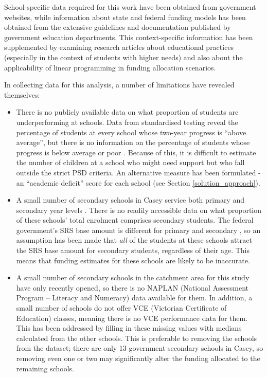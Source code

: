 \documentclass[11pt, a4paper]{article}
\begin{document}
    School-specific data required for this work have been obtained from government websites, while information about state and federal funding models has been obtained from the extensive guidelines and documentation published by government education departments. This context-specific information has been supplemented by examining research articles about educational practices (especially in the context of students with higher needs) and also about the applicability of linear programming in funding allocation scenarios.

    In collecting data for this analysis, a number of limitations have revealed themselves:

    \begin{itemize}
        \item There is no publicly available data on what proportion of students are underperforming at schools. Data from standardised testing reveal the percentage of students at every school whose two-year progress is ``above average'', but there is no information on the percentage of students whose progress is below average or poor \parencite{naplan}. Because of this, it is difficult to estimate the number of children at a school who might need support but who fall outside the strict PSD criteria. An alternative measure has been formulated - an ``academic deficit'' score for each school (see Section \ref{solution_approach}).
        \item A small number of secondary schools in Casey service both primary and secondary year levels \parencite{casey_schools}. There is no readily accessible data on what proportion of these schools' total enrolment comprises secondary students. The federal government's SRS base amount is different for primary and secondary \parencite{srs_2020}, so an assumption has been made that \textit{all} of the students at these schools attract the SRS base amount for secondary students, regardless of their age. This means that funding estimates for these schools are likely to be inaccurate.
        \item A small number of secondary schools in the catchment area for this study have only recently opened, so there is no NAPLAN (National Assessment Program – Literacy and Numeracy) data available for them. In addition, a small number of schools do not offer VCE (Victorian Certificate of Education) classes, meaning there is no VCE performance data for them. This has been addressed by filling in these missing values with medians calculated from the other schools. This is preferable to removing the schools from the dataset; there are only 13 government secondary schools in Casey, so removing even one or two may significantly alter the funding allocated to the remaining schools.
    \end{itemize}
\end{document}
